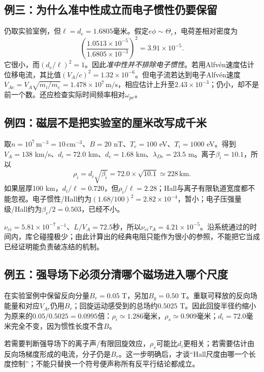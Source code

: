 \subsection{例三：为什么准中性成立而电子惯性仍要保留}
仍取实验室例，但$\ell=d_e=1.6805$毫米。假定$e\phi\sim\Theta_e$，电荷差相对密度为
\begin{equation}
\left(\frac{1.0513\times10^{-5}}{1.6805\times10^{-3}}\right)^2
=3.91\times10^{-5}.
\end{equation}
它很小，而$(d_e/\ell)^2=1$。因此\emph{准中性并不排除电子惯性}。若用Alfvén速度估计位移电流，其比值$(V_A/c)^2=1.32\times10^{-6}$。但电子流若达到电子Alfvén速度$V_{Ae}=V_A\sqrt{m_i/m_e}=1.478\times10^7\,\mathrm{m/s}$，相应估计上升至$2.43\times10^{-3}$；仍小，却不是前一个数。还应检查实际时间频率相对$\omega_{pe}$。

\subsection{例四：磁层不是把实验室的厘米改写成千米}
取$n=10^7\,\mathrm{m^{-3}}=10\,\mathrm{cm^{-3}}$、$B=20$ nT、$T_e=100$ eV、$T_i=1000$ eV。得到$V_A=138$ km/s、$d_i=72.0$ km、$d_e=1.68$ km、$\lambda_{De}=23.5$ m。离子$\beta_i=10.1$，所以
\begin{equation}
\rho_i=d_i\sqrt{\beta_i}=72.0\times\sqrt{10.1}\simeq228\,\mathrm{km}.
\end{equation}
如果层厚100 km，$d_i/\ell=0.720$，但$\rho_i/\ell=2.28$；Hall与离子有限轨道宽度都不能忽视。电子惯性/Hall约为$(1.68/100)^2=2.82\times10^{-4}$，暂小；电子压强量级/Hall约为$\beta_e/2=0.503$，已经不小。

$\nu_{ei}=5.81\times10^{-7}\,\mathrm{s^{-1}}$、$L/V_A=72.5$秒，所以$\nu_{ei}\tau_A=4.21\times10^{-5}$。沿系统通过的时间内，库仑碰撞极少；由此计算出的经典电阻只能作为很小的参照，不能把它当成已经证明能负责破冻结的机制。

\subsection{例五：强导场下必须分清哪个磁场进入哪个尺度}
在实验室例中保留反向分量$B_r=0.05$ T，另加$B_g=0.50$ T。重联可释放的反向场能量和对应$V_{Ar}$仍用$B_r$；回旋运动感受到的总场约$0.5025$ T。因此回旋半径约缩小为原来的$0.05/0.5025=0.0995$倍：$\rho_i\simeq1.286$毫米，$\rho_s\simeq0.909$毫米；$d_i=72.0$毫米完全不变，因为惯性长度不含$B$。

若需要判断强导场下的离子声/有限回旋效应，$\rho_s$可能比$d_i$更相关；若需要估计由反向场梯度形成的电流，分子仍是$B_r$。这一步明确后，才谈“Hall尺度由哪一个长度控制”；不能只替换一个符号便声称所有反平行结论都成立。

